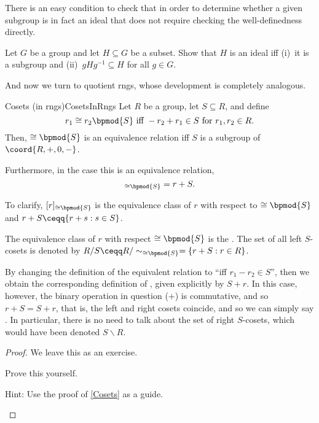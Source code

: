 There is an easy condition to check that in order to determine whether a given subgroup is in fact an ideal that does not require checking the well-definedness directly.
\begin{exr}{}{}
Let $G$ be a group and let $H\subseteq G$ be a subset.  Show that $H$ is an ideal iff (i)~it is a subgroup and (ii)~$gHg^{-1}\subseteq H$ for all $g\in G$.
\end{exr}

And now we turn to quotient rngs, whose development is completely analogous.
\begin{prp}{Cosets (in rngs)}{CosetsInRngs}
Let $R$ be a group, let $S\subseteq R$, and define
\begin{equation}
r_1\cong r_2\bpmod{S}\text{ iff }-r_2+r_1\in S\text{ for }r_1,r_2\in R.
\end{equation}
Then, $\cong \bpmod{S}$ is an equivalence relation iff $S$ is a subgroup of $\coord{R,+,0,-}$.

Furthermore, in the case this is an equivalence relation,
\begin{equation}
[r]_{\cong \bpmod{S}}=r+S.
\end{equation}
\begin{rmk}
To clarify, $[r]_{\cong \bpmod{S}}$ is the equivalence class of $r$ with respect to $\cong \bpmod{S}$ and $r+S\ceqq \{ r+s:s\in S\}$.
\end{rmk}
\begin{rmk}
The equivalence class of $r$ with respect $\cong \bpmod{S}$ is the .  The set of all left $S$-cosets is denoted by $R/S\ceqq R/\sim _{\cong \bpmod{S}}=\left\{ r+S:r\in R\right\}$.
\end{rmk}
\begin{rmk}
By changing the definition of the equivalent relation to ``\textellipsis iff $r_1-r_2\in S$'', then we obtain the corresponding definition of , given explicitly by $S+r$.  In this case, however, the binary operation in question ($+$) is commutative, and so $r+S=S+r$, that is, the left and right cosets coincide, and so we can simply say .  In particular, there is no need to talk about the set of right $S$-cosets, which would have been denoted $S\backslash R$.
\end{rmk}
\begin{proof}
We leave this as an exercise.
\begin{exr}{}{}
Prove this yourself.
\begin{rmk}
Hint:  Use the proof of \cref{Cosets} as a guide.
\end{rmk}
\end{exr}
\end{proof}
\end{prp}
